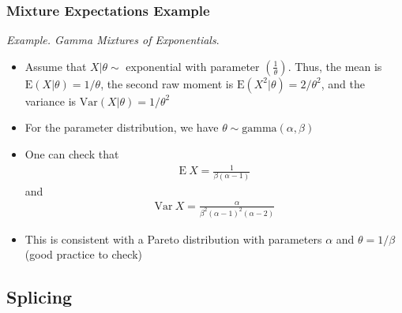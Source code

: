 \documentclass{beamer}
\begin{document}
\bigskip
\begin{frame}[shrink=2]
\frametitle{Mixture Expectations Example}
\textit{Example. Gamma Mixtures of Exponentials}.
\begin{itemize}
\item Assume that $X|\theta \sim$ exponential with parameter $(\frac{1}{\theta})$. Thus, the mean is $\mathrm{E}(X|\theta) =
1/\theta$, the second raw moment is $\mathrm{E}(X^2|\theta) =
2/\theta^2$, and the variance is $\mathrm{Var}(X|\theta) = 1/
\theta^2$ \vspace{2mm}

\item For the parameter distribution, we have $\theta \sim \text{gamma}(\alpha,
\beta)$ \vspace{2mm}

\item One can check that
\begin{eqnarray*}
\mathrm{E~}X = \frac{1}{\beta(\alpha-1)}
\end{eqnarray*}
and
\begin{eqnarray*}
\mathrm{Var~}X = \frac{\alpha}{\beta^2(\alpha-1)^2(\alpha-2)}
\end{eqnarray*} \vspace{2mm}

\item This is consistent with a Pareto distribution with parameters $\alpha$ and $\theta=1/\beta $ (good practice to check)
\end{itemize}
\end{frame}

\subsection{Splicing}
\end{document}

